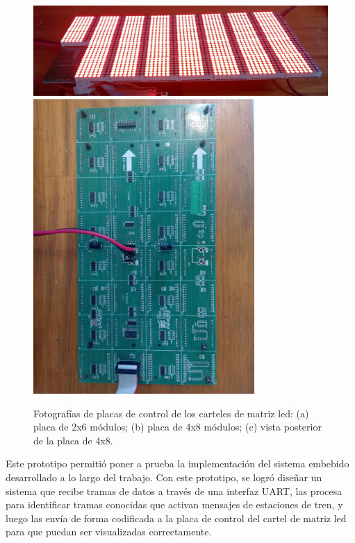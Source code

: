\begin{figure}[H]
	\centering
	\includegraphics[width=1\textwidth]{./Figures/cartelledON.jpg}\\
	\includegraphics[width=0.75\textwidth, angle=270]{./Figures/cartel4x8.jpg}\\
	\caption{Fotografías de placas de control de los carteles de matriz led: (a) placa de 2x6 módulos; (b) placa de 4x8 módulos; (c) vista posterior de la placa de 4x8.}
	\label{fig:picsDriverled}
\end{figure}

Este prototipo permitió poner a prueba la implementación del sistema embebido desarrollado a lo largo del trabajo. Con este prototipo, se logró diseñar un sistema que recibe tramas de datos a través de una interfaz UART, las procesa para identificar tramas conocidas que activan mensajes de estaciones de tren, y luego las envía de forma codificada a la placa de control del cartel de matriz led para que puedan ser visualizadas correctamente.\\

